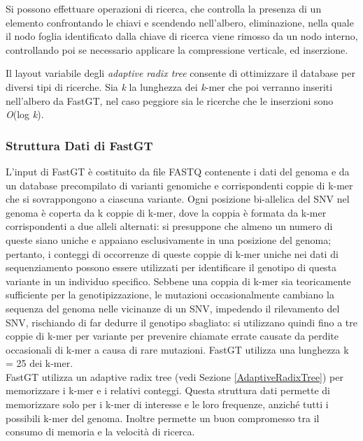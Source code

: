\documentclass[../main.tex]{subfiles}
\begin{document}
Si possono effettuare operazioni di ricerca, che controlla la presenza di un elemento confrontando le chiavi e scendendo nell'albero, eliminazione, nella quale il nodo foglia identificato dalla chiave di ricerca viene rimosso da un nodo interno, controllando poi se necessario applicare la compressione verticale, ed inserzione.

Il layout variabile degli \textit{adaptive radix tree} consente di ottimizzare il database per diversi tipi di ricerche. Sia \textit{k} la lunghezza dei \textit{k}-mer che poi verranno inseriti nell'albero da FastGT, nel caso peggiore sia le ricerche che le inserzioni sono \textit{O}(log \textit{k}).



\subsubsection{Struttura Dati di FastGT}
\label{strutturaDatiFastGT}

L'input di FastGT è costituito da file FASTQ contenente i dati del genoma e da un database precompilato di varianti genomiche e corrispondenti coppie di k-mer che si sovrappongono a ciascuna variante. Ogni posizione bi-allelica del SNV nel genoma è coperta da k coppie di k-mer, dove la coppia è formata da k-mer corrispondenti a due alleli alternati: si presuppone che almeno un numero di queste siano uniche e appaiano esclusivamente in una posizione del genoma; pertanto, i conteggi di occorrenze di queste coppie di k-mer uniche nei dati di sequenziamento possono essere utilizzati per identificare il genotipo di questa variante in un individuo specifico. Sebbene una coppia di k-mer sia teoricamente sufficiente per la genotipizzazione, le mutazioni occasionalmente cambiano la sequenza del genoma nelle vicinanze di un SNV, impedendo il rilevamento del SNV, rischiando di far dedurre il genotipo sbagliato: si utilizzano quindi fino a tre coppie di k-mer per variante per prevenire chiamate errate causate da perdite occasionali di k-mer a causa di rare mutazioni. FastGT utilizza una lunghezza k = 25 dei k-mer. \\

FastGT utilizza un adaptive radix tree (vedi Sezione \ref{AdaptiveRadixTree}) per memorizzare i k-mer e i relativi conteggi. Questa struttura dati permette di memorizzare  solo per i k-mer di interesse e le loro frequenze, anziché tutti i possibili k-mer del genoma. Inoltre permette un buon compromesso tra il consumo di memoria e la velocità di ricerca. 
\end{document}
